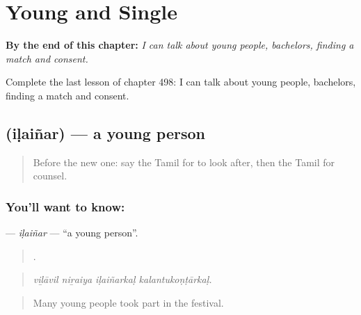 
\chapter{Young and Single}
\label{ch:ta-young-and-single}

\begin{chapteropening}
\textbf{By the end of this chapter:} \emph{I can talk about young people, bachelors, finding a match and consent.}

Complete the last lesson of chapter 498: I can talk about young people, bachelors, finding a match and consent.
\end{chapteropening}

\section[\texorpdfstring{\ta{இளைஞர்} (iḷaiñar)}{இளைஞர் (iḷaiñar)}]{ (iḷaiñar) — a young person}

\label{lesson:TA-C498-ilainar}



\begin{quote}
Before the new one: say the Tamil for to look after, then the Tamil for counsel.
\end{quote}

\subsection*{You'll want to know: }
\textbf{} — \emph{iḷaiñar} — \textquotedblleft{}a young person\textquotedblright{}.

\begin{quote}
   .
\end{quote}

\begin{quote}
\emph{viḻāvil niṟaiya iḷaiñarkaḷ kalantukoṇṭārkaḷ.}
\end{quote}

\begin{quote}
Many young people took part in the festival.
\end{quote}

